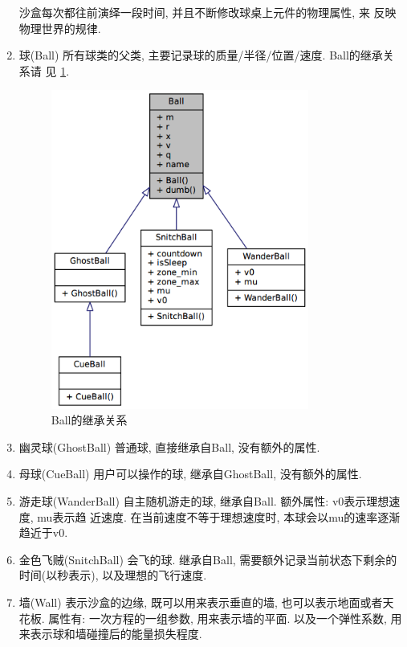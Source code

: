 \documentclass[11pt]{article}
\begin{document}
\begin{enumerate}
沙盒每次都往前演绎一段时间, 并且不断修改球桌上元件的物理属性, 来
反映物理世界的规律.
\item 球(Ball)
\label{sec-3-2-1-2}
所有球类的父类, 主要记录球的质量/半径/位置/速度. Ball的继承关系请
见 \ref{fig:ball_inherit}.
\begin{figure}[h]
\centering
\includegraphics[width=0.8\textwidth]{html/struct_ball__inherit__graph.png}
\caption{Ball的继承关系}
\label{fig:ball_inherit}
\end{figure}
\item 幽灵球(GhostBall)
\label{sec-3-2-1-3}
普通球, 直接继承自Ball, 没有额外的属性. 
\item 母球(CueBall)
\label{sec-3-2-1-4}
用户可以操作的球, 继承自GhostBall, 没有额外的属性.
\item 游走球(WanderBall)
\label{sec-3-2-1-5}
自主随机游走的球, 继承自Ball. 额外属性: v0表示理想速度, mu表示趋
近速度. 在当前速度不等于理想速度时, 本球会以mu的速率逐渐趋近于v0.
\item 金色飞贼(SnitchBall)
\label{sec-3-2-1-6}
会飞的球. 继承自Ball, 需要额外记录当前状态下剩余的时间(以秒表示),
以及理想的飞行速度.

\item 墙(Wall)
\label{sec-3-2-1-7}
表示沙盒的边缘, 既可以用来表示垂直的墙, 也可以表示地面或者天花板.
属性有: 一次方程的一组参数, 用来表示墙的平面. 以及一个弹性系数,
用来表示球和墙碰撞后的能量损失程度.
\end{enumerate}
\end{document}
